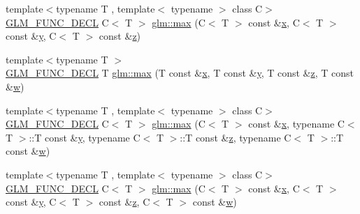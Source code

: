 \begin{DoxyCompactItemize}
\item 
{\footnotesize template$<$typename T , template$<$ typename $>$ class C$>$ }\\\mbox{\hyperlink{setup_8hpp_ab2d052de21a70539923e9bcbf6e83a51}{G\+L\+M\+\_\+\+F\+U\+N\+C\+\_\+\+D\+E\+CL}} C$<$ T $>$ \mbox{\hyperlink{group__gtx__extented__min__max_gaf832e9d4ab4826b2dda2fda25935a3a4}{glm\+::max}} (C$<$ T $>$ const \&\mbox{\hyperlink{glad_8h_a92d0386e5c19fb81ea88c9f99644ab1d}{x}}, C$<$ T $>$ const \&\mbox{\hyperlink{glad_8h_a66ddd433d2cacfe27f5906b7e86faeed}{y}}, C$<$ T $>$ const \&\mbox{\hyperlink{glad_8h_acb78bf1972d3eaf07da34ff2e0a2f133}{z}})
\item 
{\footnotesize template$<$typename T $>$ }\\\mbox{\hyperlink{setup_8hpp_ab2d052de21a70539923e9bcbf6e83a51}{G\+L\+M\+\_\+\+F\+U\+N\+C\+\_\+\+D\+E\+CL}} T \mbox{\hyperlink{group__gtx__extented__min__max_ga78e04a0cef1c4863fcae1a2130500d87}{glm\+::max}} (T const \&\mbox{\hyperlink{glad_8h_a92d0386e5c19fb81ea88c9f99644ab1d}{x}}, T const \&\mbox{\hyperlink{glad_8h_a66ddd433d2cacfe27f5906b7e86faeed}{y}}, T const \&\mbox{\hyperlink{glad_8h_acb78bf1972d3eaf07da34ff2e0a2f133}{z}}, T const \&\mbox{\hyperlink{glad_8h_a1d0296e9e835f2e1ee17634af95fc1ec}{w}})
\item 
{\footnotesize template$<$typename T , template$<$ typename $>$ class C$>$ }\\\mbox{\hyperlink{setup_8hpp_ab2d052de21a70539923e9bcbf6e83a51}{G\+L\+M\+\_\+\+F\+U\+N\+C\+\_\+\+D\+E\+CL}} C$<$ T $>$ \mbox{\hyperlink{group__gtx__extented__min__max_ga7cca8b53cfda402040494cdf40fbdf4a}{glm\+::max}} (C$<$ T $>$ const \&\mbox{\hyperlink{glad_8h_a92d0386e5c19fb81ea88c9f99644ab1d}{x}}, typename C$<$ T $>$\+::T const \&\mbox{\hyperlink{glad_8h_a66ddd433d2cacfe27f5906b7e86faeed}{y}}, typename C$<$ T $>$\+::T const \&\mbox{\hyperlink{glad_8h_acb78bf1972d3eaf07da34ff2e0a2f133}{z}}, typename C$<$ T $>$\+::T const \&\mbox{\hyperlink{glad_8h_a1d0296e9e835f2e1ee17634af95fc1ec}{w}})
\item 
{\footnotesize template$<$typename T , template$<$ typename $>$ class C$>$ }\\\mbox{\hyperlink{setup_8hpp_ab2d052de21a70539923e9bcbf6e83a51}{G\+L\+M\+\_\+\+F\+U\+N\+C\+\_\+\+D\+E\+CL}} C$<$ T $>$ \mbox{\hyperlink{group__gtx__extented__min__max_gaacffbc466c2d08c140b181e7fd8a4858}{glm\+::max}} (C$<$ T $>$ const \&\mbox{\hyperlink{glad_8h_a92d0386e5c19fb81ea88c9f99644ab1d}{x}}, C$<$ T $>$ const \&\mbox{\hyperlink{glad_8h_a66ddd433d2cacfe27f5906b7e86faeed}{y}}, C$<$ T $>$ const \&\mbox{\hyperlink{glad_8h_acb78bf1972d3eaf07da34ff2e0a2f133}{z}}, C$<$ T $>$ const \&\mbox{\hyperlink{glad_8h_a1d0296e9e835f2e1ee17634af95fc1ec}{w}})
\end{DoxyCompactItemize}


